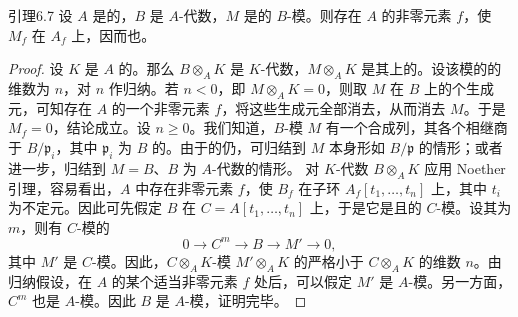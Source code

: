 \begin{SGAresult}{引理}{6.7}
设 $A$ 是的，$B$ 是 $A$-代数，$M$ 是的 $B$-模。则存在 $A$ 的非零元素 $f$，使 $M_f$ 在 $A_f$ 上，因而也。
\end{SGAresult}
\begin{proof}
设 $K$ 是 $A$ 的。那么 $B\otimes_A K$ 是 $K$-代数，$M\otimes_A K$ 是其上的。设该模的的维数为 $n$，对 $n$ 作归纳。若 $n<0$，即 $M\otimes_A K=0$，则取 $M$ 在 $B$ 上的个生成元，可知存在 $A$ 的一个非零元素 $f$，将这些生成元全部消去，从而消去 $M$。于是 $M_f=0$，结论成立。设 $n\ge0$。我们知道，$B$-模 $M$ 有一个合成列，其各个相继商于 $B/\mathfrak p_i$，其中 $\mathfrak p_i$ 为 $B$ 的。由于的仍，可归结到 $M$ 本身形如 $B/\mathfrak p$ 的情形；或者进一步，归结到 $M=B$、$B$ 为 $A$-代数的情形。
对 $K$-代数 $B\otimes_A K$ 应用 Noether 引理，容易看出，$A$ 中存在非零元素 $f$，使 $B_f$ 在子环 $A_f[t_1,\ldots,t_n]$ 上，其中 $t_i$ 为不定元。因此可先假定 $B$ 在 $C=A[t_1,\ldots,t_n]$ 上，于是它是且的 $C$-模。设其为 $m$，则有 $C$-模的
\[
0\longrightarrow C^m\longrightarrow B\longrightarrow M'\longrightarrow0,
\]
其中 $M'$ 是 $C$-模。因此，$C\otimes_A K$-模 $M'\otimes_A K$ 的严格小于 $C\otimes_A K$ 的维数 $n$。由归纳假设，在 $A$ 的某个适当非零元素 $f$ 处后，可以假定 $M'$ 是 $A$-模。另一方面，$C^m$ 也是 $A$-模。因此 $B$ 是 $A$-模，证明完毕。
\end{proof}

